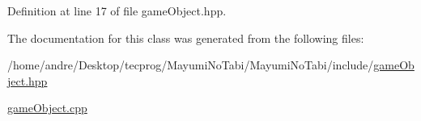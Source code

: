 Definition at line 17 of file game\-Object.\-hpp.



The documentation for this class was generated from the following files\-:\begin{DoxyCompactItemize}
\item 
/home/andre/\-Desktop/tecprog/\-Mayumi\-No\-Tabi/\-Mayumi\-No\-Tabi/include/\hyperlink{game_object_8hpp}{game\-Object.\-hpp}\item 
\hyperlink{game_object_8cpp}{game\-Object.\-cpp}\end{DoxyCompactItemize}
